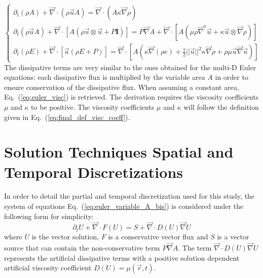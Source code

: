 \documentclass[preprint,10pt]{elsarticle}
\renewcommand{\div}{\vec{\nabla}\! \cdot \!}
\newcommand{\grad}{\vec{\nabla}}
\newcommand{\eqt}[1]{Eq.~(\ref{#1})}                     %
\newcommand{\tcr}[1]{\textcolor{red}{#1}}
\begin{document}
\begin{equation}
\label{eq:euler_variable_A_bis}
\left\{ 
\begin{array}{lll}
\partial_t \left( \rho A \right) + \div \left( \rho \vec{u} A \right) = \div \left( A \kappa \grad \rho \right) \\
\partial_t \left( \rho \vec{u} A \right) + \div \left[A\left( \rho \vec{u} \otimes \vec{u} + P \mathbf{I} \right) \right] = P \grad A + \div \left[ A \left( \mu \rho \grad^s \vec{u}  + \kappa \vec{u} \otimes \grad \rho \right) \right]\\
\partial_t \left( \rho E \right) + \div \left[ \vec{u} \left( \rho E + P \right) \right] = \div \left[ A \left( \kappa \grad \left( \rho e \right) + \frac{1}{2}|| \vec{u} ||^2 \kappa \grad \rho +  \rho \mu \vec{u} \grad \vec{u}  \right) \right]
\end{array}
\right.
\end{equation}
The dissipative terms are very similar to the ones obtained for the multi-D Euler equations: each dissipative flux is multiplied by the variable area $A$ in order to  ensure conservation of the dissipative flux. When assuming a constant area, \eqt{eq:euler_visc} is retrieved. The derivation requires the viscosity coefficients $\mu$ and $\kappa$ to be positive. The viscosity coefficients $\mu$ and $\kappa$ will follow the definition given in \eqt{eq:final_def_visc_coeff}. 
\section{Solution Techniques Spatial and Temporal Discretizations} \label{sec:solution_tech}
In order to detail the partial and temporal discretization used for this study, the system of equations \eqt{eq:euler_variable_A_bis} is considered under the following form for simplicity:
\begin{equation}
\label{eq:form}
\partial_t U + \div F\left( U \right) = S + \div D(U) \grad U
\end{equation}
where $U$ is the vector solution, $F$ is a conservative vector flux and $S$ is a vector source that can contain the non-conservative term $P\grad A$. The term $\div D(U) \grad U$ represents the artificial dissipative terms with a positive solution dependent artificial viscosity coefficient $D(U) = \mu(\vec{r},t)$. 
\end{document}
